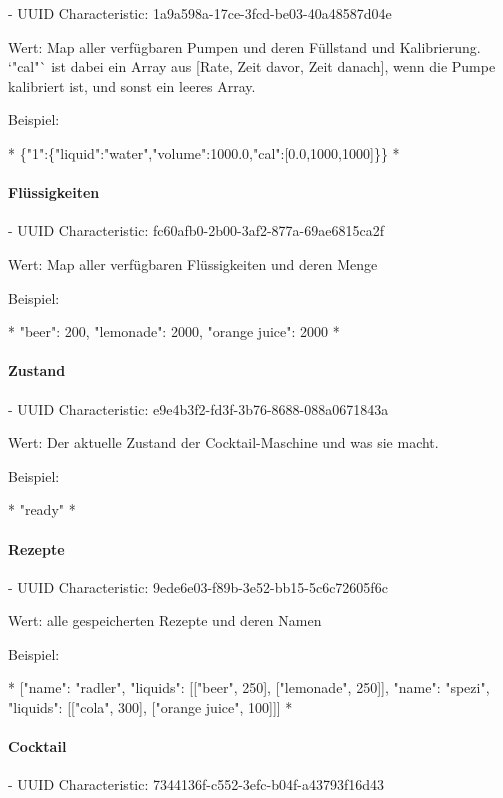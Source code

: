 - UUID Characteristic: 1a9a598a-17ce-3fcd-be03-40a48587d04e

Wert: Map aller verfügbaren Pumpen und deren Füllstand und Kalibrierung. `"cal"` ist dabei ein Array aus [Rate, Zeit davor, Zeit danach], wenn die Pumpe kalibriert ist, und sonst ein leeres Array.

Beispiel:

*
\{"1":\{"liquid":"water","volume":1000.0,"cal":[0.0,1000,1000]\}\}
	*
	
\paragraph{Flüssigkeiten}
	
	- UUID Characteristic: fc60afb0-2b00-3af2-877a-69ae6815ca2f
	
	Wert: Map aller verfügbaren Flüssigkeiten und deren Menge
	
	Beispiel:
	
	*
	{"beer": 200, "lemonade": 2000, "orange juice": 2000}
	*
	
\paragraph{Zustand}
	
	- UUID Characteristic: e9e4b3f2-fd3f-3b76-8688-088a0671843a
	
	Wert: Der aktuelle Zustand der Cocktail-Maschine und was sie macht.
	
	Beispiel:
	
	*
	"ready"
	*
	
\paragraph{Rezepte}
	
	- UUID Characteristic: 9ede6e03-f89b-3e52-bb15-5c6c72605f6c
	
	Wert: alle gespeicherten Rezepte und deren Namen
	
	Beispiel:
	
	*
	[{"name": "radler", "liquids": [["beer", 250], ["lemonade", 250]]}, {"name": "spezi", "liquids": [["cola", 300], ["orange juice", 100]]}]
	*
	
\paragraph{Cocktail}
	
	- UUID Characteristic: 7344136f-c552-3efc-b04f-a43793f16d43
	
